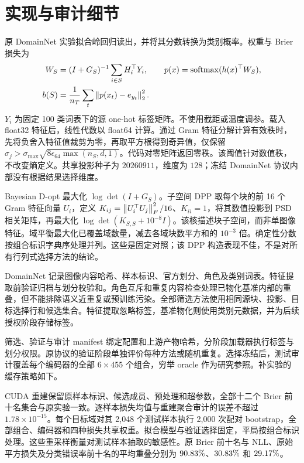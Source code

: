 \section{实现与审计细节}
\label{app:protocol}
原 DomainNet 实验拟合岭回归读出，并将其分数转换为类别概率。权重与 Brier 损失为
\begin{equation}
 \begin{aligned}
 W_S&=(I+G_S)^{-1}\sum_{i\in S}H_i^\top Y_i,\qquad
 p(x)=\operatorname{softmax}(h(x)^\top W_S),\\
 b(S)&=\frac1{n_T}\sum_t\left\lVert p(x_t)-e_{y_t}\right\rVert_2^2.
 \end{aligned}
\end{equation}
$Y_i$ 为固定 100 类词表下的源 one-hot 标签矩阵。不使用截距或温度调参。载入 float32 特征后，线性代数以 float64 计算。通过 Gram 特征分解计算有效秩时，先将负舍入特征值裁剪为零，再取平方根得到奇异值，仅保留 $\sigma_j>\sigma_{\max}\sqrt{8\epsilon_{64}\max(n_S,d,1)}$。代码对零矩阵返回零秩。该阈值针对数值秩，不改变熵定义。共享投影种子为 $20260911$，维度为 $128$；冻结 DomainNet 协议内部没有根据结果选择维度。

Bayesian D-opt 最大化 $\log\det(I+G_S)$。子空间 DPP 取每个块的前 16 个 Gram 特征向量 $U_i$，定义 $K_{ij}=\left\lVert U_i^\top U_j\right\rVert_F^2/16$、$K_{ii}=1$，将其数值投影到 PSD 相关矩阵，再最大化 $\log\det(K_{S,S}+10^{-8}I)$。该核描述块子空间，而非单图像特征。域平衡最大化已覆盖域数量，减去各域块数平方和的 $10^{-3}$ 倍。确定性分数按组合标识字典序处理并列。这些是固定对照；该 DPP 构造表现不佳，不是对所有行列式选择方法的结论。

DomainNet 记录图像内容哈希、样本标识、官方划分、角色及类别词表。特征提取前验证归档与划分校验和。角色互斥和重复内容检查处理已物化基准内部的重叠，但不能排除语义近重复或预训练污染。全部筛选方法使用相同源块、投影、目标选择行和候选集合。特征提取忽略标签，基准物化则使用类别元数据，并为后续授权阶段存储标签。

筛选、验证与审计 manifest 绑定配置和上游产物哈希，分阶段加载器执行标签与划分权限。原协议的验证阶段单独评价每种方法或随机重复。选择冻结后，测试审计覆盖每个编码器的全部 $6\times455$ 个组合，穷举 oracle 作为研究参照。补实验的缓存策略如下。

CUDA 重建保留原样本标识、候选成员、预处理和超参数，全部十二个 Brier 前十名集合与原实验一致。逐样本损失均值与重建聚合审计的误差不超过 $1.78\times10^{-15}$。每个目标域对其 2,048 个测试样本执行 2,000 次配对 bootstrap，全部组合、编码器和四种损失共享权重。拟合模型与验证选择固定，平局按组合标识处理。这些重采样衡量对测试样本抽取的敏感性。原 Brier 前十名与 NLL、原始平方损失及分类错误率前十名的平均重叠分别为 $90.83\%$、$30.83\%$ 和 $29.17\%$。

